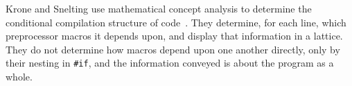 \documentclass[10pt]{article}
\begin{document}

Krone and Snelting use mathematical concept analysis to determine the
conditional compilation structure of code~\cite{Krone94}.  They determine,
for each line, which preprocessor macros it depends upon, and display that
information in a lattice.  They do not determine how macros depend upon one
another directly, only by their nesting in {\tt \#if}, and the information
conveyed is about the program as a whole.


{\small }
\end{document}
